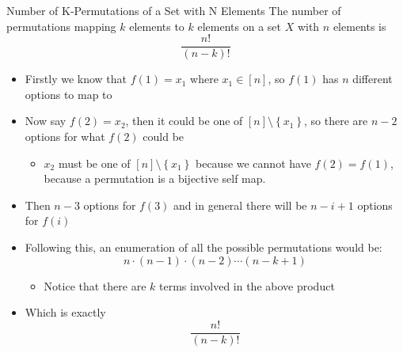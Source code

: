 \documentclass{standalone}
\begin{document}
\begin{theo*}{Number of K-Permutations of a Set with N Elements}
  The number of permutations mapping $k$ elements to $k$ elements on a set $X$ with $n$ elements is 
  \[
  \frac{n!}{ \left( n  - k \right)!}
  \]
  \begin{pf}
    \begin{itemize}
      \item Firstly we know that $f\left(1\right) = x_1$ where $x_1 \in  \left[ n \right]$, so $f\left(1\right)$ has $n$ different options to map to
      \item Now say $ f\left(2\right) = x_{2}$, then it could be one of $ \left[ n \right] \setminus \left\{ x_{1} \right\}$, so there are $n-2$ options for what $f\left(2\right)$ could be
        \begin{itemize}
          \item $x_{2}$ must be one of $ \left[ n \right] \setminus \left\{ x_{1} \right\}$ because we cannot have $f\left(2\right)= f\left(1\right)$, because a permutation is a bijective self map.
        \end{itemize}
      \item Then $n-3$ options for $f\left(3\right)$ and in general there will be $n  - i + 1$ options for $f\left(i\right)$
      \item Following this, an enumeration of all the possible permutations would be:
        \[
        n  \cdot \left( n -1 \right)  \cdot  \left( n-2 \right) \dotsb  \left( n  - k  + 1 \right)
        \]
        \begin{itemize}
          \item Notice that there are $k$ terms involved in the above product
        \end{itemize}
      \item Which is exactly
        \[
        \frac{n!}{ \left(  n  - k \right)!}
        \]
    \end{itemize}
  \end{pf}
\end{theo*}
\end{document}

